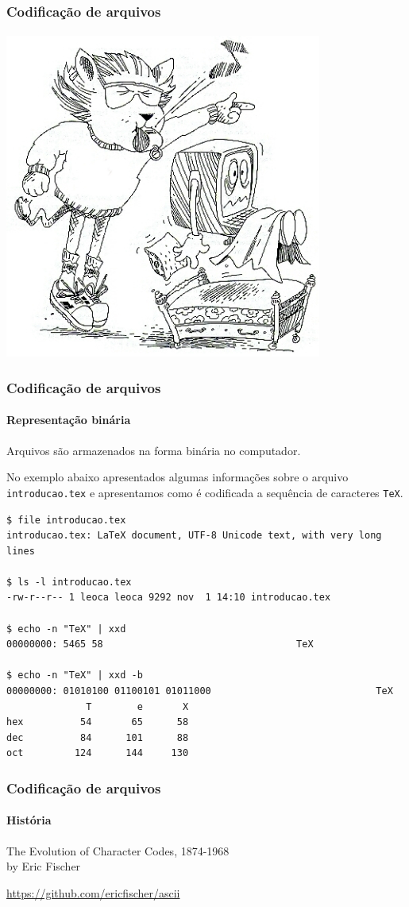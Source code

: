 \begin{frame}
\frametitle{Codificação de arquivos}
\framesubtitle{}
\centering
\includegraphics[width=0.5\linewidth]{figures/TexLionWhistle.jpg}
\end{frame}

\begin{frame}[fragile]
\frametitle{Codificação de arquivos}
\framesubtitle{Representação binária}
Arquivos são armazenados na forma binária no computador. 

No exemplo abaixo apresentados algumas informações sobre o arquivo \texttt{introducao.tex}
e apresentamos como é codificada a sequência de caracteres \texttt{TeX}.
\begin{footnotesize}
\begin{verbatim}
$ file introducao.tex 
introducao.tex: LaTeX document, UTF-8 Unicode text, with very long lines

$ ls -l introducao.tex
-rw-r--r-- 1 leoca leoca 9292 nov  1 14:10 introducao.tex

$ echo -n "TeX" | xxd
00000000: 5465 58                                  TeX

$ echo -n "TeX" | xxd -b
00000000: 01010100 01100101 01011000                             TeX
              T        e       X
hex          54       65      58 
dec          84      101      88
oct         124      144     130
\end{verbatim}
\end{footnotesize}
\end{frame}


\begin{frame}
\frametitle{Codificação de arquivos}
\framesubtitle{História}
  The Evolution of Character Codes, 1874-1968\\
  by Eric Fischer

  \vspace{2em}
  \url{https://github.com/ericfischer/ascii}
\end{frame}


